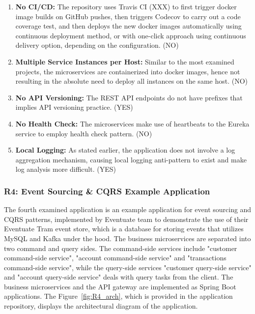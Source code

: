 \documentclass{Configuration_Files/PoliMi3i_thesis}
\begin{document}
\begin{enumerate}
    \item \textbf{No CI/CD:} The repository uses Travis CI (XXX) to first trigger docker image builds on GitHub pushes, then triggers Codecov to carry out a code coverage test, and then deploys the new docker images automatically using continuous deployment method, or with one-click approach using continuous delivery option, depending on the configuration. (NO)
    
    \item \textbf{Multiple Service Instances per Host:} Similar to the most examined projects, the microservices are containerized into docker images, hence not resulting in the absolute need to deploy all instances on the same host. (NO)
    
    \item \textbf{No API Versioning:} The REST API endpoints do not have prefixes that implies API versioning practice. (YES)
    
    \item \textbf{No Health Check:} The microservices make use of heartbeats to the Eureka service to employ health check pattern. (NO)
    
    \item \textbf{Local Logging:} As stated earlier, the application does not involve a log aggregation mechanism, causing local logging anti-pattern to exist and make log analysis more difficult. (YES)
\end{enumerate}

\subsubsection{R4: Event Sourcing \& CQRS Example Application}
\label{subsubsec:R4}

The fourth examined application is an example application for event sourcing and CQRS patterns, implemented by Eventuate team to demonstrate the use of their Eventuate Tram event store, which is a database for storing events that utilizes MySQL and Kafka under the hood.
The business microservices are separated into two command and query sides.
The command-side services include "customer command-side service", "account command-side service" and "transactions command-side service", while the query-side services "customer query-side service" and "account query-side service" deals with query tasks from the client.
The business microservices and the API gateway are implemented as Spring Boot applications.
The Figure~\ref{fig:R4_arch}, which is provided in the application repository, displays the architectural diagram of the application.
\end{document}
